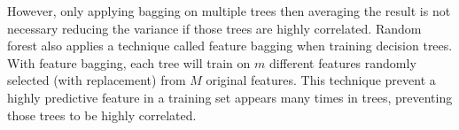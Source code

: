However, only applying bagging on multiple trees then averaging the result is not necessary reducing the variance if those trees are highly correlated. Random forest also applies a technique called feature bagging when training decision trees. With feature bagging, each tree will train on $m$ different features randomly selected (with replacement) from $M$ original features. This technique prevent a highly predictive feature in a training set appears many times in trees, preventing those trees to be highly correlated.

